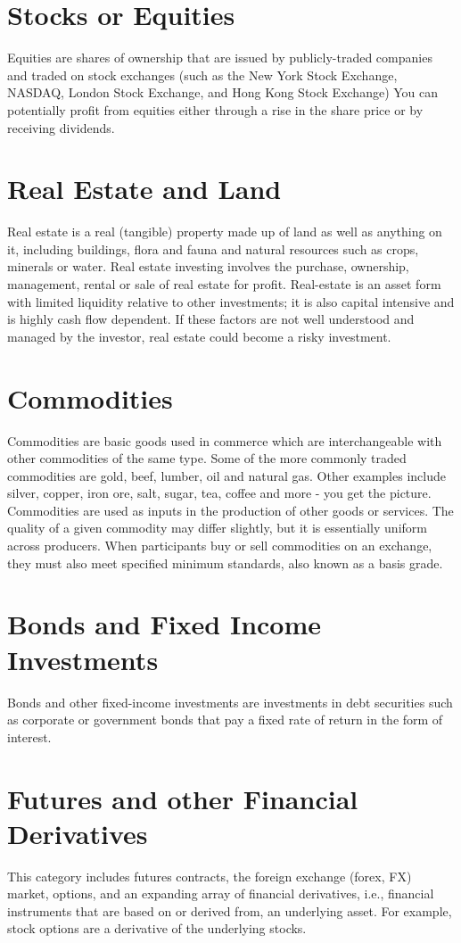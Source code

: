\section{Stocks or Equities}
Equities are shares of ownership that are issued by publicly-traded companies and traded on stock exchanges (such as the New York Stock Exchange, NASDAQ, London Stock Exchange, and Hong Kong Stock Exchange) You can potentially profit from equities either through a rise in the share price or by receiving dividends.

\section{Real Estate and Land}
Real estate is a real (tangible) property made up of land as well as anything on it, including buildings, flora and fauna and natural resources such as crops, minerals or water. Real estate investing involves the purchase, ownership, management, rental or sale of real estate for profit. Real-estate is an asset form with limited liquidity relative to other investments; it is also capital intensive and is highly cash flow dependent. If these factors are not well understood and managed by the investor, real estate could become a risky investment.

\section{Commodities}
Commodities are basic goods used in commerce which are interchangeable with other commodities of the same type.
Some of the more commonly traded commodities are gold, beef, lumber, oil and natural gas. Other examples include silver, copper, iron ore, salt, sugar, tea, coffee and more - you get the picture.
Commodities are used as inputs in the production of other goods or services. The quality of a given commodity may differ slightly, but it is essentially uniform across producers. When participants buy or sell commodities on an exchange, they must also meet specified minimum standards, also known as a basis grade.

\section{Bonds and Fixed Income Investments}
Bonds and other fixed-income investments are investments in debt securities such as corporate or government bonds that pay a fixed rate of return in the form of interest. 

\section{Futures and other Financial Derivatives}
This category includes futures contracts, the foreign exchange (forex, FX) market, options, and an expanding array of financial derivatives, i.e., financial instruments that are based on or derived from, an underlying asset. For example, stock options are a derivative of the underlying stocks.

